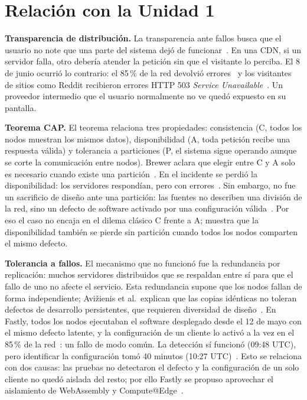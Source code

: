 \section*{Relación con la Unidad 1}
\textbf{Transparencia de distribución.} La transparencia ante fallos busca que el usuario no note que una parte del sistema dejó de funcionar~\cite{vansteen2016}. En una CDN, si un servidor falla, otro debería atender la petición sin que el visitante lo perciba. El 8 de junio ocurrió lo contrario: el 85\,\% de la red devolvió errores~\cite{fastly2021} y los visitantes de sitios como Reddit recibieron errores HTTP 503 \textit{Service Unavailable}~\cite{medina2021thousandeyes}. Un proveedor intermedio que el usuario normalmente no ve quedó expuesto en su pantalla.

\textbf{Teorema CAP.} El teorema relaciona tres propiedades: consistencia (C, todos los nodos muestran los mismos datos), disponibilidad (A, toda petición recibe una respuesta válida) y tolerancia a particiones (P, el sistema sigue operando aunque se corte la comunicación entre nodos). Brewer aclara que elegir entre C y A solo es necesario cuando existe una partición~\cite{brewer2012}. En el incidente se perdió la disponibilidad: los servidores respondían, pero con errores~\cite{fastly2021,medina2021thousandeyes}. Sin embargo, no fue un sacrificio de diseño ante una partición: las fuentes no describen una división de la red, sino un defecto de software activado por una configuración válida~\cite{fastly2021}. Por eso el caso no encaja en el dilema clásico C frente a A; muestra que la disponibilidad también se pierde sin partición cuando todos los nodos comparten el mismo defecto.

\textbf{Tolerancia a fallos.} El mecanismo que no funcionó fue la redundancia por replicación: muchos servidores distribuidos que se respaldan entre sí para que el fallo de uno no afecte el servicio. Esta redundancia supone que los nodos fallan de forma independiente; Avižienis et al.\ explican que las copias idénticas no toleran defectos de desarrollo persistentes, que requieren diversidad de diseño~\cite{avizienis2004}. En Fastly, todos los nodos ejecutaban el software desplegado desde el 12 de mayo con el mismo defecto latente, y la configuración de un cliente lo activó a la vez en el 85\,\% de la red~\cite{fastly2021}: un fallo de modo común. La detección sí funcionó (09:48 UTC), pero identificar la configuración tomó 40 minutos (10:27 UTC)~\cite{fastly2021}. Esto se relaciona con dos causas: las pruebas no detectaron el defecto y la configuración de un solo cliente no quedó aislada del resto; por ello Fastly se propuso aprovechar el aislamiento de WebAssembly y Compute@Edge~\cite{fastly2021}.
